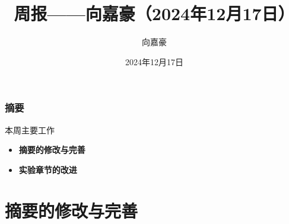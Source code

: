 \documentclass{beamer}
\title{\textbf{周报——向嘉豪（2024年12月17日）}}
\author{向嘉豪}
\institute{衡阳师范学院}
\date{2024年12月17日}
\begin{document}
\begin{frame}
    \titlepage
\end{frame}

\begin{frame}
    \frametitle{摘要}
    \begin{block}{本周主要工作}
        \begin{itemize}
            \item \textbf{摘要的修改与完善}
            \item \textbf{实验章节的改进}
        \end{itemize}
    \end{block}
 
\end{frame}

\section{摘要的修改与完善}
\end{document}
